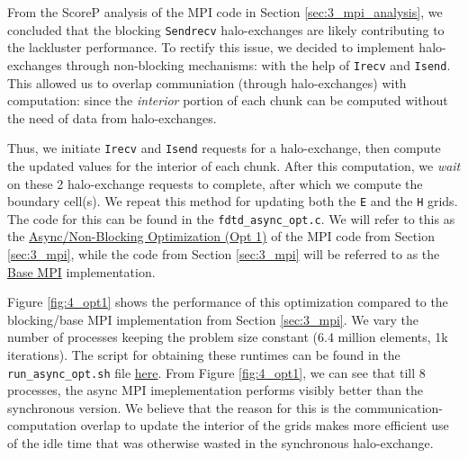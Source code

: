 \documentclass[a4paper,10pt]{article}
\begin{document}
\begin{multicols}{2}
From the ScoreP analysis of the MPI code in Section \ref{sec:3_mpi_analysis}, we concluded that the blocking \verb|Sendrecv| halo-exchanges are likely contributing to the lackluster performance. To rectify this issue, we decided to implement halo-exchanges through non-blocking mechanisms: with the help of \verb|Irecv| and \verb|Isend|. This allowed us to overlap communiation (through halo-exchanges) with computation: since the \textit{interior} portion of each chunk can be computed without the need of data from halo-exchanges.

Thus, we initiate  \verb|Irecv| and \verb|Isend| requests for a halo-exchange, then compute the updated values for the interior of each chunk. After this computation, we \textit{wait} on these 2 halo-exchange requests to complete, after which we compute the boundary cell(s). We repeat this method for updating both the \verb|E| and the \verb|H| grids. The code for this can be found in the \verb|fdtd_async_opt.c|. We will refer to this as the \underline{Async/Non-Blocking Optimization (Opt 1)} of the MPI code from Section \ref{sec:3_mpi}, while the code from Section \ref{sec:3_mpi} will be referred to as the \underline{Base MPI} implementation.

Figure \ref{fig:4_opt1} shows the performance of this optimization compared to the blocking/base MPI implementation from Section \ref{sec:3_mpi}. We vary the number of processes keeping the problem size constant (6.4 million elements, 1k iterations). The script for obtaining these runtimes can be found in the \verb|run_async_opt.sh| file \href{https://github.com/paulmyr/DD2356-MethodsHPC/blob/master/5_project/4_opt/run_async_opt.sh}{here}. From Figure \ref{fig:4_opt1}, we can see that till 8 processes, the async MPI imeplementation performs visibly better than the synchronous version. We believe that the reason for this is the communication-computation overlap to update the interior of the grids makes more efficient use of the idle time that was otherwise wasted in the synchronous halo-exchange.


\end{multicols}
\end{document}
